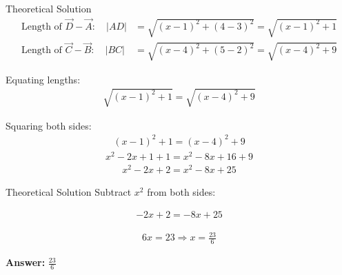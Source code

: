 \documentclass{beamer}
\begin{document}
\begin{frame}{Theoretical Solution}
\begin{align}
	\text{Length of } \vec{D}-\vec{A}: \quad |AD| &= \sqrt{(x - 1)^2 + (4 - 3)^2} = \sqrt{(x - 1)^2 + 1} \\
	\text{Length of } \vec{C}-\vec{B}: \quad |BC| &= \sqrt{(x - 4)^2 + (5 - 2)^2} = \sqrt{(x - 4)^2 + 9}
\end{align}

Equating lengths:
\begin{align}
\sqrt{(x - 1)^2 + 1} = \sqrt{(x - 4)^2 + 9}
\end{align}

Squaring both sides:
\begin{align}
(x - 1)^2 + 1 = (x - 4)^2 + 9
\end{align}
\begin{align}
x^2 - 2x + 1 + 1 = x^2 - 8x + 16 + 9
\end{align}
\begin{align}
x^2 - 2x + 2 = x^2 - 8x + 25
\end{align}

\end{frame}

\begin{frame}{Theoretical Solution}
Subtract $x^2$ from both sides:

\begin{align}
-2x + 2 = -8x + 25
\end{align}

\begin{align}
6x = 23 \Rightarrow x = \frac{23}{6}
\end{align}

\textbf{Answer:} $ \boxed{\frac{23}{6}} $
\end{frame}
\end{document}
